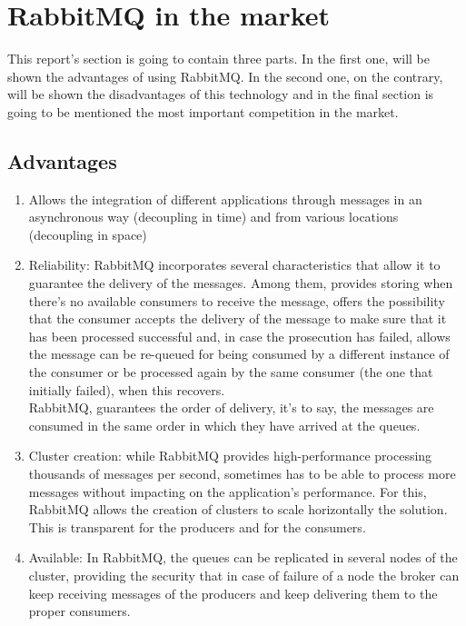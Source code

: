 \documentclass[12pt]{article}
\begin{document}
\section*{RabbitMQ in the  market}
This report's section is going to contain three parts. In the first one, will be shown the advantages of using RabbitMQ. In the second one, on the contrary, will be shown the disadvantages of this technology and in the final section is going to be mentioned the most important competition in the market.

\subsection*{Advantages}
\begin{enumerate}
    \item Allows the integration of different applications through messages in an asynchronous way (decoupling in time) and from various locations (decoupling in space)
    \item Reliability: RabbitMQ incorporates several characteristics that allow it to guarantee the delivery of the messages. Among them, provides storing when there's no available consumers to receive the message, offers the possibility that the consumer accepts the delivery of the message to make sure that it has been processed successful and, in case the prosecution has failed, allows the message can be re-queued for being consumed by a different instance of the consumer or be processed again by the same consumer (the one that initially failed), when this recovers.\\
    RabbitMQ, guarantees the order of delivery, it's to say, the messages are consumed in the same order in which they have arrived at the queues.
    \item Cluster creation: while RabbitMQ provides high-performance processing thousands of messages per second, sometimes has to be able to process more messages without impacting on the application's performance. For this, RabbitMQ allows the creation of clusters to scale horizontally the solution. This is transparent for the producers and for the consumers.
    \item Available: In RabbitMQ, the queues can be replicated in several nodes of the cluster, providing the security that in case of failure of a node the broker can keep receiving messages of the producers and keep delivering them to the proper consumers.
\end{enumerate}
\end{document}
